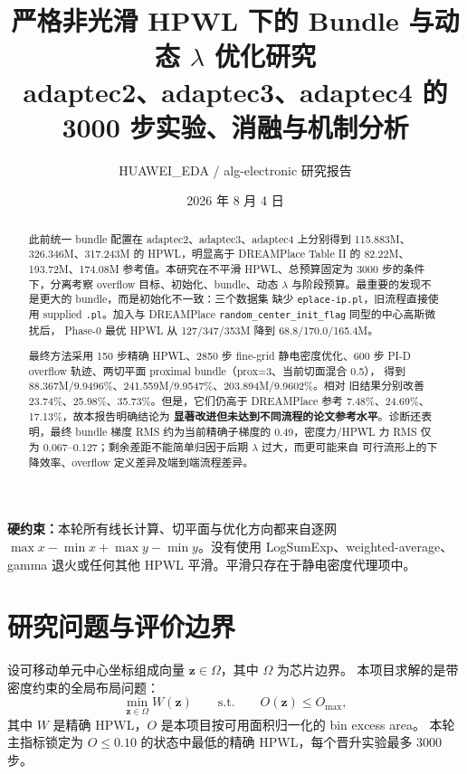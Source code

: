 \documentclass[UTF8,fontset=windows,a4paper,11pt]{ctexart}
\title{\textbf{严格非光滑 HPWL 下的 Bundle 与动态 $\lambda$ 优化研究}\\
\large adaptec2、adaptec3、adaptec4 的 3000 步实验、消融与机制分析}
\author{HUAWEI\_EDA / alg-electronic 研究报告}
\date{2026 年 8 月 4 日}
\newcommand{\code}[1]{\texttt{#1}}
\begin{document}
\maketitle

\begin{center}
\colorbox{soft}{\parbox{0.93\textwidth}{
\textbf{硬约束：}本轮所有线长计算、切平面与优化方向都来自逐网
$\max x-\min x+\max y-\min y$。没有使用 LogSumExp、weighted-average、
gamma 退火或任何其他 HPWL 平滑。平滑只存在于静电密度代理项中。
}}
\end{center}

\begin{abstract}
此前统一 bundle 配置在 adaptec2、adaptec3、adaptec4 上分别得到
115.883M、326.346M、317.243M 的 HPWL，明显高于 DREAMPlace Table II 的
82.22M、193.72M、174.08M 参考值。本研究在不平滑 HPWL、总预算固定为
3000 步的条件下，分离考察 overflow 目标、初始化、bundle、动态 $\lambda$
与阶段预算。最重要的发现不是更大的 bundle，而是初始化不一致：三个数据集
缺少 \code{eplace-ip.pl}，旧流程直接使用 supplied \code{.pl}。加入与
DREAMPlace \code{random\_center\_init\_flag} 同型的中心高斯微扰后，
Phase-0 最优 HPWL 从 127/347/353M 降到 68.8/170.0/165.4M。

最终方法采用 150 步精确 HPWL、2850 步 fine-grid 静电密度优化、600 步
PI-D overflow 轨迹、两切平面 proximal bundle（prox=3、当前切面混合 0.5），
得到 88.367M/9.9496\%、241.559M/9.9547\%、203.894M/9.9602\%。相对
旧结果分别改善 23.74\%、25.98\%、35.73\%。但是，它们仍高于
DREAMPlace 参考 7.48\%、24.69\%、17.13\%，故本报告明确结论为
\textbf{显著改进但未达到不同流程的论文参考水平}。诊断还表明，最终 bundle
梯度 RMS 约为当前精确子梯度的 0.49，密度力/HPWL 力 RMS 仅为
0.067--0.127；剩余差距不能简单归因于后期 $\lambda$ 过大，而更可能来自
可行流形上的下降效率、overflow 定义差异及端到端流程差异。
\end{abstract}

\tableofcontents
\newpage

\section{研究问题与评价边界}

设可移动单元中心坐标组成向量 $\bm z\in\Omega$，其中 $\Omega$ 为芯片边界。
本项目求解的是带密度约束的全局布局问题：
\begin{equation}
  \min_{\bm z\in\Omega} W(\bm z)
  \qquad \text{s.t.}\qquad O(\bm z)\leq O_{\max},
  \label{eq:constrained}
\end{equation}
其中 $W$ 是精确 HPWL，$O$ 是本项目按可用面积归一化的 bin excess area。
本轮主指标锁定为 $O\leq 0.10$ 的状态中最低的精确 HPWL，每个晋升实验最多
3000 步。
\end{document}
